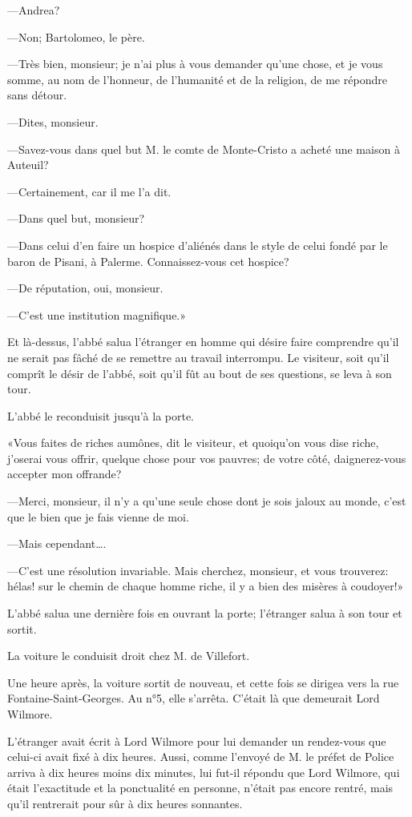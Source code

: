 —Andrea? 

—Non; Bartolomeo, le père. 

—Très bien, monsieur; je n'ai plus à vous demander qu'une chose, et je vous somme, au nom de l'honneur, de l'humanité et de la religion, de me répondre sans détour. 

—Dites, monsieur. 

—Savez-vous dans quel but M. le comte de Monte-Cristo a acheté une maison à Auteuil? 

—Certainement, car il me l'a dit. 

—Dans quel but, monsieur? 

—Dans celui d'en faire un hospice d'aliénés dans le style de celui fondé par le baron de Pisani, à Palerme. Connaissez-vous cet hospice? 

—De réputation, oui, monsieur. 

—C'est une institution magnifique.» 

Et là-dessus, l'abbé salua l'étranger en homme qui désire faire comprendre qu'il ne serait pas fâché de se remettre au travail interrompu. Le visiteur, soit qu'il comprît le désir de l'abbé, soit qu'il fût au bout de ses questions, se leva à son tour. 

L'abbé le reconduisit jusqu'à la porte. 

«Vous faites de riches aumônes, dit le visiteur, et quoiqu'on vous dise riche, j'oserai vous offrir, quelque chose pour vos pauvres; de votre côté, daignerez-vous accepter mon offrande? 

—Merci, monsieur, il n'y a qu'une seule chose dont je sois jaloux au monde, c'est que le bien que je fais vienne de moi. 

—Mais cependant\dots.  

—C'est une résolution invariable. Mais cherchez, monsieur, et vous trouverez: hélas! sur le chemin de chaque homme riche, il y a bien des misères à coudoyer!» 

L'abbé salua une dernière fois en ouvrant la porte; l'étranger salua à son tour et sortit. 

La voiture le conduisit droit chez M. de Villefort. 

Une heure après, la voiture sortit de nouveau, et cette fois se dirigea vers la rue Fontaine-Saint-Georges. Au n°5, elle s'arrêta. C'était là que demeurait Lord Wilmore. 

L'étranger avait écrit à Lord Wilmore pour lui demander un rendez-vous que celui-ci avait fixé à dix heures. Aussi, comme l'envoyé de M. le préfet de Police arriva à dix heures moins dix minutes, lui fut-il répondu que Lord Wilmore, qui était l'exactitude et la ponctualité en personne, n'était pas encore rentré, mais qu'il rentrerait pour sûr à dix heures sonnantes. 

